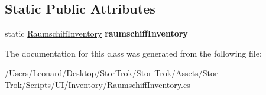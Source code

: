 \subsection*{Static Public Attributes}
\begin{DoxyCompactItemize}
\item 
\mbox{\label{class_raumschiff_inventory_a6f027b9779464645116e2de940e81cfe}} 
static \hyperlink{class_raumschiff_inventory}{Raumschiff\+Inventory} {\bfseries raumschiff\+Inventory}
\end{DoxyCompactItemize}


The documentation for this class was generated from the following file\+:\begin{DoxyCompactItemize}
\item 
/\+Users/\+Leonard/\+Desktop/\+Stor\+Trok/\+Stor Trok/\+Assets/\+Stor Trok/\+Scripts/\+U\+I/\+Inventory/Raumschiff\+Inventory.\+cs\end{DoxyCompactItemize}
